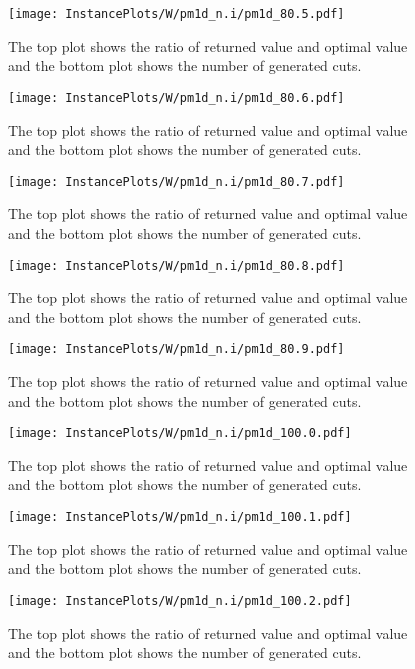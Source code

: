 \documentclass[10pt,a4paper]{article}
\begin{document}
\begin{figure}[H]
\texttt{[image: InstancePlots/W/pm1d\_n.i/pm1d\_80.5.pdf]}
\caption{The top plot shows the ratio of returned value and optimal value     and the bottom plot shows the number of generated cuts.}
\end{figure}

\begin{figure}[H]
\texttt{[image: InstancePlots/W/pm1d\_n.i/pm1d\_80.6.pdf]}
\caption{The top plot shows the ratio of returned value and optimal value     and the bottom plot shows the number of generated cuts.}
\end{figure}

\begin{figure}[H]
\texttt{[image: InstancePlots/W/pm1d\_n.i/pm1d\_80.7.pdf]}
\caption{The top plot shows the ratio of returned value and optimal value     and the bottom plot shows the number of generated cuts.}
\end{figure}

\begin{figure}[H]
\texttt{[image: InstancePlots/W/pm1d\_n.i/pm1d\_80.8.pdf]}
\caption{The top plot shows the ratio of returned value and optimal value     and the bottom plot shows the number of generated cuts.}
\end{figure}

\begin{figure}[H]
\texttt{[image: InstancePlots/W/pm1d\_n.i/pm1d\_80.9.pdf]}
\caption{The top plot shows the ratio of returned value and optimal value     and the bottom plot shows the number of generated cuts.}
\end{figure}

\begin{figure}[H]
\texttt{[image: InstancePlots/W/pm1d\_n.i/pm1d\_100.0.pdf]}
\caption{The top plot shows the ratio of returned value and optimal value     and the bottom plot shows the number of generated cuts.}
\end{figure}

\begin{figure}[H]
\texttt{[image: InstancePlots/W/pm1d\_n.i/pm1d\_100.1.pdf]}
\caption{The top plot shows the ratio of returned value and optimal value     and the bottom plot shows the number of generated cuts.}
\end{figure}

\begin{figure}[H]
\texttt{[image: InstancePlots/W/pm1d\_n.i/pm1d\_100.2.pdf]}
\caption{The top plot shows the ratio of returned value and optimal value     and the bottom plot shows the number of generated cuts.}
\end{figure}
\end{document}

